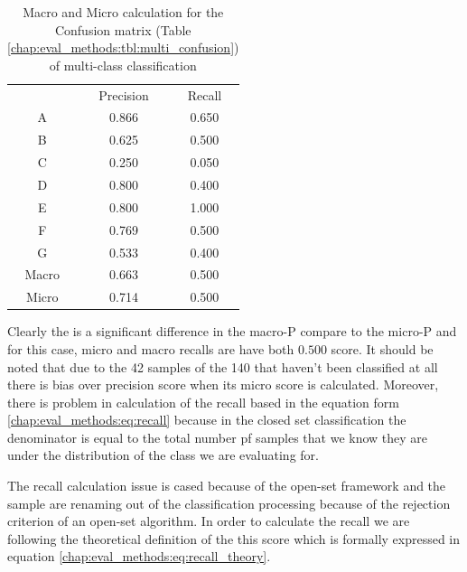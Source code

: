 \begin{table}[H]
	\center
	\caption{Macro and Micro calculation for the Confusion matrix (Table \ref{chap:eval_methods:tbl:multi_confusion}) of multi-class classification}\label{chap:eval_methods:tbl:macro_vs_micro}
	\begin{tabular}{l l l}
		\cline{2-3}
		& \multicolumn{1}{|c}{Precision} & \multicolumn{1}{c|}{Recall}\\
		\cline{1-3}
		\multicolumn{1}{|c}{A} & \multicolumn{1}{|c}{0.866} & \multicolumn{1}{c|}{0.650}\\
		\multicolumn{1}{|c}{B} & \multicolumn{1}{|c}{0.625} & \multicolumn{1}{c|}{0.500}\\
		\multicolumn{1}{|c}{C} & \multicolumn{1}{|c}{0.250} & \multicolumn{1}{c|}{0.050}\\
		\multicolumn{1}{|c}{D} & \multicolumn{1}{|c}{0.800} & \multicolumn{1}{c|}{0.400}\\
		\multicolumn{1}{|c}{E} & \multicolumn{1}{|c}{0.800} & \multicolumn{1}{c|}{1.000}\\
		\multicolumn{1}{|c}{F} & \multicolumn{1}{|c}{0.769} & \multicolumn{1}{c|}{0.500}\\
		\multicolumn{1}{|c}{G} & \multicolumn{1}{|c}{0.533} & \multicolumn{1}{c|}{0.400}\\
		\cline{1-3}
		\multicolumn{1}{|c}{Macro} & \multicolumn{1}{|c}{0.663} & \multicolumn{1}{c|}{0.500}\\
		\multicolumn{1}{|c}{Micro} & \multicolumn{1}{|c}{0.714} & \multicolumn{1}{c|}{0.500}\\
		\cline{1-3}
	\end{tabular}
\end{table}


Clearly the is a significant difference in the macro-P compare to the micro-P and for this case, micro and macro recalls are have both $0.500$ score. It should be noted that due to the 42 samples of the 140 that haven't been classified at all there is bias over precision score when its micro score is calculated. Moreover, there is problem in calculation of the recall based in the equation form \ref{chap:eval_methods:eq:recall} because in the closed set classification the denominator is equal to the total number pf samples that we know they are under the distribution of the class we are evaluating for. 

The recall calculation issue is cased because of the open-set framework and the sample are renaming out of the classification processing because of the rejection criterion of an open-set algorithm. In order to calculate the recall we are following the theoretical definition of the this score which is formally expressed in equation \ref{chap:eval_methods:eq:recall_theory}.

